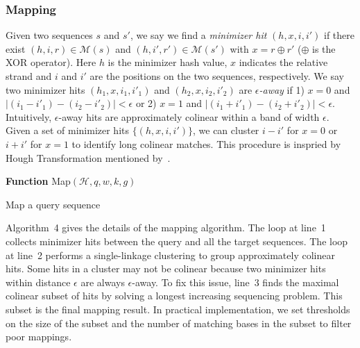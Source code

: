 \documentclass{bioinfo}
\begin{document}
\begin{methods}
\subsubsection{Mapping}

Given two sequences $s$ and $s'$, we say we find a \emph{minimizer hit}
$(h,x,i,i')$ if there exist $(h,i,r)\in\mathcal{M}(s)$ and
$(h,i',r')\in\mathcal{M}(s')$ with $x=r\oplus r'$ ($\oplus$ is the XOR
operator). Here $h$ is the minimizer hash value, $x$ indicates the relative
strand and $i$ and $i'$ are the positions on the two sequences, respectively.
We say two minimizer hits $(h_1,x,i_1,i'_1)$ and $(h_2,x,i_2,i'_2)$ are
\emph{$\epsilon$-away} if 1) $x=0$ and $|(i_1-i'_1)-(i_2-i'_2)|<\epsilon$
or 2) $x=1$ and $|(i_1+i'_1)-(i_2+i'_2)|<\epsilon$. Intuitively,
$\epsilon$-away hits are approximately colinear within a band of width
$\epsilon$.  Given a set of minimizer hits $\{(h,x,i,i')\}$, we can cluster
$i-i'$ for $x=0$ or $i+i'$ for $x=1$ to identify long colinear matches.
This procedure is inspried by Hough Transformation mentioned
by~\citet{sovic:2015aa}. 

\begin{algorithm}[tb]
\DontPrintSemicolon
\footnotesize
{}
\BlankLine
\textbf{Function} {\sc Map}$(\mathcal{H},q,w,k,g)$
\caption{Map a query sequence}
\end{algorithm}

Algorithm~4 gives the details of the mapping algorithm. The loop at line~1
collects minimizer hits between the query and all the target sequences. The
loop at line~2 performs a single-linkage clustering to group approximately
colinear hits. Some hits in a cluster may not be colinear because two minimizer
hits within distance $\epsilon$ are always $\epsilon$-away. To fix this issue,
line~3 finds the maximal colinear subset of hits by solving a longest
increasing sequencing problem. This subset is the final mapping result. In
practical implementation, we set thresholds on the size of the subset and the
number of matching bases in the subset to filter poor mappings.


\end{methods}
\end{document}
